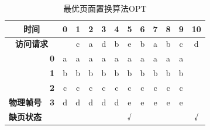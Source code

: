 \begin{table}[H]
	\centering
	\begin{tabular}{|clc|c|c|c|c|c|c|c|c|c|c|c|}
		\hline
		\multicolumn{3}{|c|}{\textbf{时间}}                       & \textbf{0} & \textbf{1} & \textbf{2}               & \textbf{3}               & \textbf{4}               & \textbf{5}               & \textbf{6}               & \textbf{7}               & \textbf{8}               & \textbf{9}               & \textbf{10}                  \\ \hline
		\multicolumn{3}{|c|}{\textbf{访问请求}}                   &            & c          & a                        & d                        & b                        & e                        & b                        & a                        & b                        & c                        & d                            \\ \hline
		\multicolumn{2}{|c|}{}                                    & \textbf{0} & a          & a                        & {\color[HTML]{FE0000} a} & a                        & a                        & a                        & a                        & {\color[HTML]{FE0000} a} & a                        & a                        &   \\ \cline{3-14}
		\multicolumn{2}{|c|}{}                                    & \textbf{1} & b          & b                        & b                        & b                        & {\color[HTML]{FE0000} b} & b                        & {\color[HTML]{FE0000} b} & b                        & {\color[HTML]{FE0000} b} & b                        &   \\ \cline{3-14}
		\multicolumn{2}{|c|}{}                                    & \textbf{2} & c          & {\color[HTML]{FE0000} c} & c                        & c                        & c                        & c                        & c                        & c                        & c                        & {\color[HTML]{FE0000} c} &   \\ \cline{3-14}
		\multicolumn{2}{|c|}{\multirow{-4}{*}{\textbf{物理帧号}}} & \textbf{3} & d          & d                        & d                        & {\color[HTML]{FE0000} d} & d                        & {\color[HTML]{FE0000} e} & e                        & e                        & e                        & e                        &   \\ \hline
		\multicolumn{2}{|c|}{\textbf{缺页状态}}                   &            &            &                          &                          &                          &                          & √                        &                          &                          &                          &                          & √ \\ \hline
	\end{tabular}
	\caption{最优页面置换算法OPT}
\end{table}

